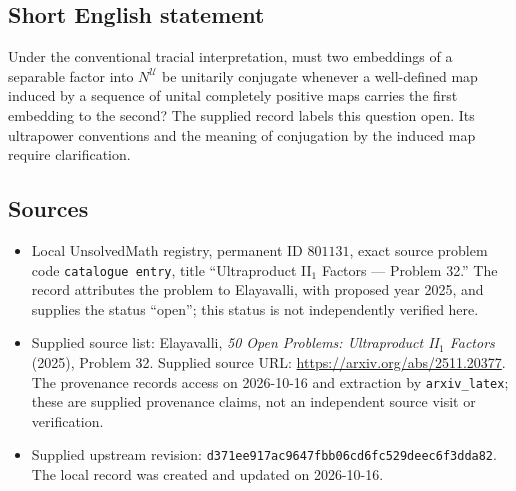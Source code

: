 \documentclass[11pt]{article}
\begin{document}
\subsection{Short English statement}
Under the conventional tracial interpretation, must two embeddings of a separable factor into \(N^{\mathcal U}\) be unitarily conjugate whenever a well-defined map induced by a sequence of unital completely positive maps carries the first embedding to the second? The supplied record labels this question open. Its ultrapower conventions and the meaning of conjugation by the induced map require clarification.
\subsection{Sources}
\begin{itemize}
\item Local UnsolvedMath registry, permanent ID \(801131\), exact source problem code \texttt{catalogue entry}, title ``Ultraproduct II\(_1\) Factors --- Problem 32.'' The record attributes the problem to Elayavalli, with proposed year 2025, and supplies the status ``open''; this status is not independently verified here.
\item Supplied source list: Elayavalli, \emph{50 Open Problems: Ultraproduct II\(_1\) Factors} (2025), Problem 32. Supplied source URL: \url{https://arxiv.org/abs/2511.20377}. The provenance records access on 2026-10-16 and extraction by \texttt{arxiv\_latex}; these are supplied provenance claims, not an independent source visit or verification.
\item Supplied upstream revision: \texttt{d371ee917ac9647fbb06cd6fc529deec6f3dda82}. The local record was created and updated on 2026-10-16.
\end{itemize}
\end{document}
